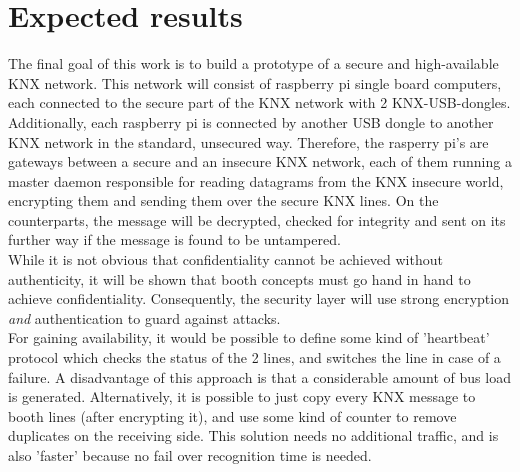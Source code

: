 \documentclass[a4paper,12pt,twoside]{memoir}
\begin{document}
\section{Expected results}

The final goal of this work is to build a prototype of a secure and high-available KNX network. This network
will consist of raspberry pi single board computers, each connected to the secure part of the KNX network
with 2 KNX-USB-dongles. Additionally, each raspberry pi is connected by
another USB dongle to another KNX  network in the standard, unsecured way. Therefore, the rasperry pi's
are gateways between a secure and an insecure KNX network, each of them running a master daemon responsible
for reading datagrams from the KNX insecure world, encrypting them and sending them over the secure
KNX lines. On the counterparts, the message will be decrypted, checked for integrity and sent
on its further way if the message is found to be untampered. 
\\
While it is not obvious that confidentiality cannot be achieved without authenticity,
it will be shown that booth concepts must go hand in hand to achieve confidentiality. 
Consequently, the security layer will use strong encryption \textit{and} authentication to guard
against attacks.
\\

For gaining availability, it would be possible to define some kind of 'heartbeat' protocol which checks the status
of the 2 lines, and switches the line in case of a failure. A disadvantage of this approach is that a considerable
amount of bus load is generated. Alternatively, it is possible to just copy every KNX message to booth lines
(after encrypting it), and use some kind of counter to remove duplicates on the receiving side. This solution
needs no additional traffic, and is also 'faster' because no fail over recognition time is needed. 
\\

\end{document}
